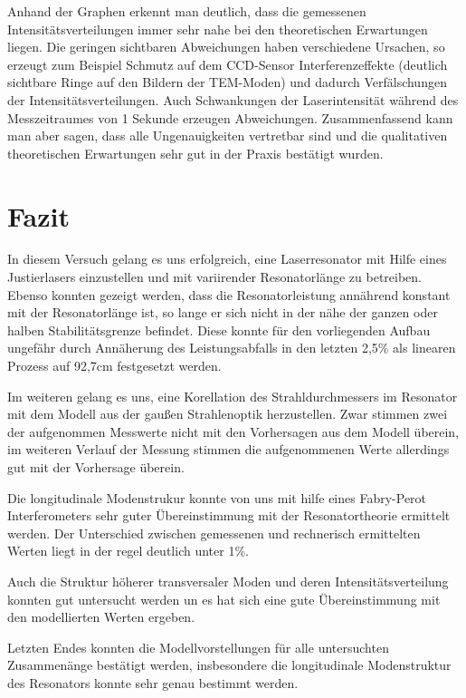 \documentclass[bigchapter,colorback,accentcolor=tud4b,linedtoc,11pt]{tudreport}
\numberwithin{equation}{subsection}
\begin{document}
\FloatBarrier
Anhand der Graphen erkennt man deutlich, dass die gemessenen Intensitätsverteilungen immer sehr nahe bei den theoretischen Erwartungen liegen. Die geringen sichtbaren Abweichungen haben verschiedene Ursachen, so erzeugt zum Beispiel Schmutz auf dem CCD-Sensor Interferenzeffekte (deutlich sichtbare Ringe auf den Bildern der TEM-Moden) und dadurch Verfälschungen der Intensitätsverteilungen. Auch Schwankungen der Laserintensität während des Messzeitraumes von 1 Sekunde erzeugen Abweichungen. Zusammenfassend kann man aber sagen, dass alle Ungenauigkeiten vertretbar sind und die qualitativen theoretischen Erwartungen sehr gut in der Praxis bestätigt wurden.

\chapter{Fazit}
In diesem Versuch gelang es uns erfolgreich, eine Laserresonator mit Hilfe eines Justierlasers einzustellen und mit variirender Resonatorlänge zu betreiben. Ebenso konnten gezeigt werden, dass die Resonatorleistung annährend konstant mit der Resonatorlänge ist, so lange er sich nicht in der nähe der ganzen oder halben Stabilitätsgrenze befindet. Diese konnte für den vorliegenden Aufbau ungefähr durch Annäherung des Leistungsabfalls in den letzten 2,5\% als linearen Prozess auf 92,7cm festgesetzt werden.

Im weiteren gelang es uns, eine Korellation des Strahldurchmessers im Resonator mit dem Modell aus der gaußen Strahlenoptik herzustellen. Zwar stimmen zwei der aufgenommen Messwerte nicht mit den Vorhersagen aus dem Modell überein, im weiteren Verlauf der Messung stimmen die aufgenommenen Werte allerdings gut mit der Vorhersage überein.

Die longitudinale Modenstrukur konnte von uns mit hilfe eines Fabry-Perot Interferometers sehr guter Übereinstimmung mit der Resonatortheorie ermittelt werden. Der Unterschied zwischen gemessenen und rechnerisch ermittelten Werten liegt in der regel deutlich unter 1\%.

Auch die Struktur höherer transversaler Moden und deren Intensitätsverteilung konnten gut untersucht werden un es hat sich eine gute Übereinstimmung mit den modellierten Werten ergeben.

Letzten Endes konnten die Modellvorstellungen für alle untersuchten Zusammenänge bestätigt werden, insbesondere die longitudinale Modenstruktur des Resonators konnte sehr genau bestimmt werden.
\end{document}
